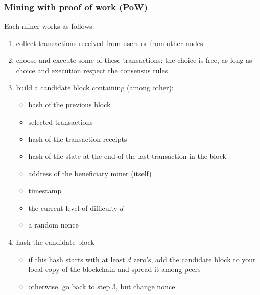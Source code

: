 \documentclass[11pt]{beamer}  %
\begin{document}
\begin{frame}\frametitle{Mining with proof of work (PoW)}
  Each miner works as follows:
  \begin{enumerate}
  \item collect transactions received from users or from other nodes
  \item choose and execute some of these transactions: the choice is free,
    as long as choice and execution respect the \alert{consensus rules}
  \item build a candidate block containing (among other):
    \begin{itemize}
    \item hash of the previous block
    \item selected transactions
    \item hash of the transaction receipts
    \item hash of the state at the end of the last transaction in the block
    \item address of the beneficiary miner (itself)
    \item timestamp
    \item the current level of difficulty $d$
    \item a random \alert{nonce}    
    \end{itemize}
  \item hash the candidate block
    \begin{itemize}
    \item if this hash starts with at least $d$ zero's, add the candidate block to
      your local copy of the blockchain and
      spread it among peers
    \item otherwise, go back to step 3, but change nonce
    \end{itemize}
  \end{enumerate}
\end{frame}
\end{document}
